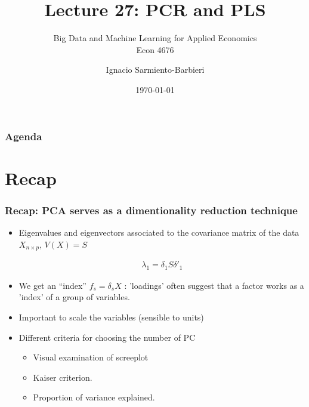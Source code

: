 \documentclass[
  shownotes,
  xcolor={svgnames},
  hyperref={colorlinks,citecolor=DarkBlue,linkcolor=DarkRed,urlcolor=DarkBlue}
  , aspectratio=169]{beamer}
\begin{document}
 
\title[Lecture 27]{Lecture 27:   PCR and PLS}
\subtitle{Big Data and Machine Learning for Applied Economics \\ Econ 4676}
\date{\today}

\author[Sarmiento-Barbieri]{Ignacio Sarmiento-Barbieri}


\begin{frame}[noframenumbering]
\maketitle
\end{frame}






\begin{frame}
\frametitle{Agenda}

\tableofcontents

\end{frame}

\section{Recap}
\begin{frame}[fragile]
\frametitle{Recap: PCA serves as a dimentionality reduction technique }


\begin{itemize}

\item Eigenvalues and eigenvectors associated to the covariance matrix of the data $X_{n\times p}$, $V(X)=S$
  
  \begin{align}
  \lambda_1 = \delta_1 S \delta'_1 
  \end{align}
\medskip
\item We get an ``index'' $f_s = \delta_s X$ : 'loadings' often suggest that a factor works as a 'index' of a group of variables.
\medskip
\item Important to scale the variables (sensible to units)
\medskip
\item Different criteria for choosing the number of PC

\begin{itemize}
  \item Visual examination of screeplot
  \item Kaiser criterion.
  \item Proportion of variance explained.
\end{itemize}
\end{itemize}

\end{frame}
\end{document}
